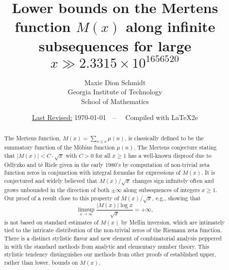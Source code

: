 \documentclass[11pt,reqno,a4letter]{article}
\title{
       \LARGE{
       Lower bounds on the Mertens function $M(x)$ along infinite subsequences for large 
       $x \gg 2.3315 \times 10^{1656520}$ 
       } 
}
\author{{\large Maxie Dion Schmidt} \\ 
        {\small Georgia Institute of Technology} \\ 
        {\small School of Mathematics} 
}
\date{\small\underline{Last Revised:} \today\ \ -- \ \ Compiled with \LaTeX2e}
\numberwithin{figure}{section}
\numberwithin{table}{section}
\theoremstyle{plain}
\numberwithin{theorem}{section}
\theoremstyle{definition}
\begin{document}
 

\maketitle

\begin{abstract} 
The Mertens function, $M(x) = \sum_{n \leq x} \mu(n)$, is classically 
defined to be the summatory function of the M\"obius function 
$\mu(n)$. The 
Mertens conjecture stating that $|M(x)| < C \cdot \sqrt{x}$ with $C > 0$ for all 
$x \geq 1$ has a well-known disproof due to Odlyzko and t\'{e} Riele given in the early 1980's by computation of 
non-trivial zeta function zeros in conjunction with integral formulas for expressions of $M(x)$. 
It is conjectured and widely believed that $M(x) / \sqrt{x}$ changes sign infinitely often and grows 
unbounded in the direction of both $\pm \infty$ along subsequences of integers $x \geq 1$. 
Our proof of a result close to this property of $M(x)/\sqrt{x}$, e.g., showing that 
$$\limsup_{x \rightarrow \infty} \frac{|M(x)| \log x}{\sqrt{x}} = +\infty,$$ is not based on 
standard estimates of $M(x)$ by Mellin inversion, which are intimately tied to the 
intricate distribution of the non-trivial zeros of the Riemann zeta function. 
There is a distinct stylistic 
flavor and new element of combinatorial analysis 
peppered in with the standard methods from analytic and elementary number theory. 
This stylistic tendency distinguishes 
our methods from other proofs of established upper, rather than lower, bounds on $M(x)$. 


\end{abstract}
\end{document}
